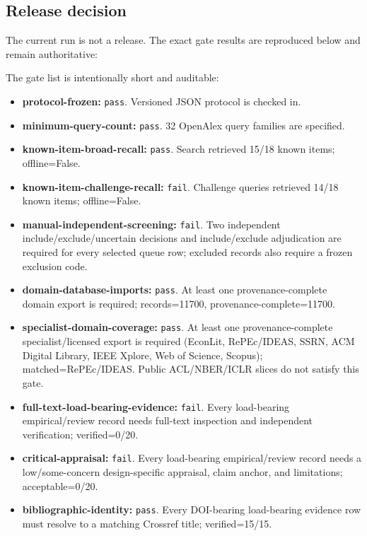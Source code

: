 \documentclass[11pt]{article}
\providecommand{\tightlist}{\setlength{\itemsep}{0pt}\setlength{\parskip}{0pt}}
\begin{document}
\hypertarget{release-decision}{%
\subsection{Release decision}\label{release-decision}}

The current run is not a release. The exact gate results are reproduced below and remain authoritative:

The gate list is intentionally short and auditable:

\begin{itemize}
\tightlist
\item
  \textbf{protocol-frozen:} \texttt{pass}. Versioned JSON protocol is checked in.
\item
  \textbf{minimum-query-count:} \texttt{pass}. 32 OpenAlex query families are specified.
\item
  \textbf{known-item-broad-recall:} \texttt{pass}. Search retrieved 15/18 known items; offline=False.
\item
  \textbf{known-item-challenge-recall:} \texttt{fail}. Challenge queries retrieved 14/18 known items; offline=False.
\item
  \textbf{manual-independent-screening:} \texttt{fail}. Two independent include/exclude/uncertain decisions and include/exclude adjudication are required for every selected queue row; excluded records also require a frozen exclusion code.
\item
  \textbf{domain-database-imports:} \texttt{pass}. At least one provenance-complete domain export is required; records=11700, provenance-complete=11700.
\item
  \textbf{specialist-domain-coverage:} \texttt{pass}. At least one provenance-complete specialist/licensed export is required (EconLit, RePEc/IDEAS, SSRN, ACM Digital Library, IEEE Xplore, Web of Science, Scopus); matched=RePEc/IDEAS. Public ACL/NBER/ICLR slices do not satisfy this gate.
\item
  \textbf{full-text-load-bearing-evidence:} \texttt{fail}. Every load-bearing empirical/review record needs full-text inspection and independent verification; verified=0/20.
\item
  \textbf{critical-appraisal:} \texttt{fail}. Every load-bearing empirical/review record needs a low/some-concern design-specific appraisal, claim anchor, and limitations; acceptable=0/20.
\item
  \textbf{bibliographic-identity:} \texttt{pass}. Every DOI-bearing load-bearing evidence row must resolve to a matching Crossref title; verified=15/15.

\end{itemize}
\end{document}
